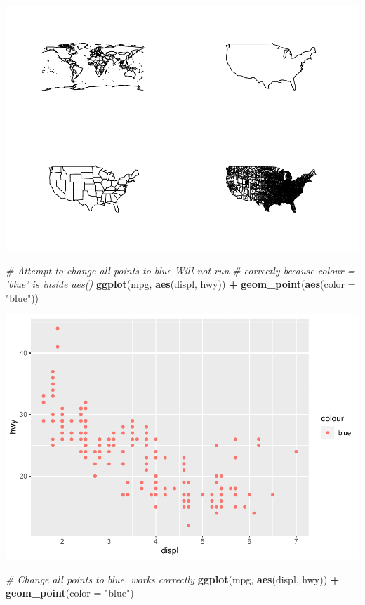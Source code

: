 \documentclass[
]{book}
\newenvironment{Shaded}{\begin{snugshade}}{\end{snugshade}}
\newcommand{\CommentTok}[1]{\textcolor[rgb]{0.56,0.35,0.01}{\textit{#1}}}
\newcommand{\DataTypeTok}[1]{\textcolor[rgb]{0.13,0.29,0.53}{#1}}
\newcommand{\KeywordTok}[1]{\textcolor[rgb]{0.13,0.29,0.53}{\textbf{#1}}}
\newcommand{\NormalTok}[1]{#1}
\newcommand{\OperatorTok}[1]{\textcolor[rgb]{0.81,0.36,0.00}{\textbf{#1}}}
\newcommand{\StringTok}[1]{\textcolor[rgb]{0.31,0.60,0.02}{#1}}
\begin{document}
\includegraphics{_main_files/figure-latex/unnamed-chunk-256-1.pdf}

\begin{Shaded}
\begin{Highlighting}[]
\CommentTok{# Attempt to change all points to blue Will not run}
\CommentTok{# correctly because colour = 'blue' is inside aes()}
\KeywordTok{ggplot}\NormalTok{(mpg, }\KeywordTok{aes}\NormalTok{(displ, hwy)) }\OperatorTok{+}\StringTok{ }\KeywordTok{geom_point}\NormalTok{(}\KeywordTok{aes}\NormalTok{(}\DataTypeTok{color =} \StringTok{"blue"}\NormalTok{))}
\end{Highlighting}
\end{Shaded}

\includegraphics{_main_files/figure-latex/unnamed-chunk-256-2.pdf}

\begin{Shaded}
\begin{Highlighting}[]
\CommentTok{# Change all points to blue, works correctly}
\KeywordTok{ggplot}\NormalTok{(mpg, }\KeywordTok{aes}\NormalTok{(displ, hwy)) }\OperatorTok{+}\StringTok{ }\KeywordTok{geom_point}\NormalTok{(}\DataTypeTok{color =} \StringTok{"blue"}\NormalTok{)}
\end{Highlighting}
\end{Shaded}
\end{document}
